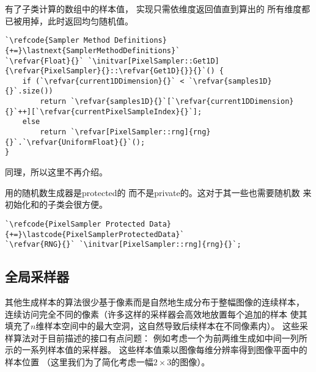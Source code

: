 有了子类计算的数组中的样本值，
实现只需依维度返回值直到算出的
所有维度都已被用掉，此时返回均匀随机值。
\begin{lstlisting}
`\refcode{Sampler Method Definitions}{+=}\lastnext{SamplerMethodDefinitions}`
`\refvar{Float}{}` `\initvar[PixelSampler::Get1D]{\refvar{PixelSampler}{}::\refvar{Get1D}{}}{}`() {
    if (`\refvar{current1DDimension}{}` < `\refvar{samples1D}{}`.size())
        return `\refvar{samples1D}{}`[`\refvar{current1DDimension}{}`++][`\refvar{currentPixelSampleIndex}{}`];
    else
        return `\refvar[PixelSampler::rng]{rng}{}`.`\refvar{UniformFloat}{}`();
}
\end{lstlisting}

同理，所以这里不再介绍。

用的随机数生成器是{\ttfamily protected}的
而不是{\ttfamily private}的。这对于其一些也需要随机数
来初始化和的子类会很方便。
\begin{lstlisting}
`\refcode{PixelSampler Protected Data}{+=}\lastcode{PixelSamplerProtectedData}`
`\refvar{RNG}{}` `\initvar[PixelSampler::rng]{rng}{}`;
\end{lstlisting}

\subsection{全局采样器}\label{sub:全局采样器}
其他生成样本的算法很少基于像素而是自然地生成分布于整幅图像的连续样本，
连续访问完全不同的像素（许多这样的采样器会高效地放置每个追加的样本
使其填充了$n$维样本空间中的最大空洞，这自然导致后续样本在不同像素内）。
这些采样算法对于目前描述的接口有点问题：
例如考虑一个为前两维生成如中间一列所示的一系列样本值的采样器。
这些样本值乘以图像每维分辨率得到图像平面中的样本位置
（这里我们为了简化考虑一幅$2\times3$的图像）。
